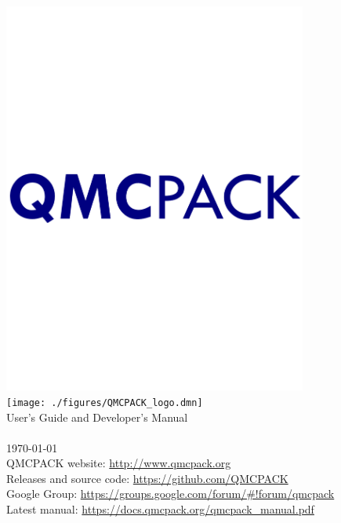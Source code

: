 
\begin{titlepage}
\vspace*{\fill}
\begin{center}

\ifpdf
\includegraphics[width=10cm]{./figures/QMCPACK_logo.pdf} \\
\else
\texttt{[image: ./figures/QMCPACK\_logo.dmn]} \\
\fi
{\huge User's Guide and Developer's Manual\\}
{\huge \QMCPACKver \\}
{\huge %
\today}\\
\vspace{2.5cm}
{\small QMCPACK website: \url{http://www.qmcpack.org}}\\
{\small Releases and source code:  \url{https://github.com/QMCPACK}}\\
{\small Google Group: \url{https://groups.google.com/forum/#!forum/qmcpack}}\\
{\small Latest manual: \url{https://docs.qmcpack.org/qmcpack_manual.pdf}}
\end{center}
\vspace*{\fill}
\end{titlepage}
